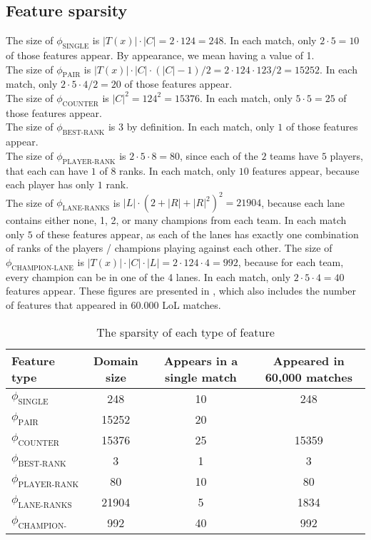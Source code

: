 \subsection{Feature sparsity}\label{sec:featuresparsity}
The size of $\phi_{\text{SINGLE}}$ is $|T(x)| \cdot |C| = 2 \cdot 124 = 248$. In each match, only $2 \cdot 5 = 10$ of those features appear. By appearance, we mean having a value of 1.\\
The size of $\phi_{\text{PAIR}}$ is $|T(x)| \cdot |C| \cdot (|C|-1) / 2 = 2 \cdot 124 \cdot 123 / 2 = 15252$. In each match, only $2 \cdot 5 \cdot 4 / 2 = 20$ of those features appear.\\
The size of $\phi_{\text{COUNTER}}$ is $|C|^2 = 124^2 = 15376$. In each match, only $5 \cdot 5 = 25$ of those features appear.\\
The size of $\phi_{\text{BEST-RANK}}$ is 3 by definition. In each match, only $1$ of those features appear.\\
The size of $\phi_{\text{PLAYER-RANK}}$ is $2 \cdot 5 \cdot 8 = 80$, since each of the $2$ teams have $5$ players, that each can have $1$ of $8$ ranks. In each match, only $10$ features appear, because each player has only $1$ rank.\\
The size of $\phi_{\text{LANE-RANKS}}$ is $|L| \cdot (2 + |R| + |R|^2)^2 = 21904$, because each lane contains either none, 1, 2, or many champions from each team.
In each match only $5$ of these features appear, as each of the lanes has exactly one combination of ranks of the players / champions playing against each other.
The size of $\phi_{\text{CHAMPION-LANE}}$ is $|T(x)| \cdot |C| \cdot |L| = 2 \cdot 124 \cdot 4 = 992$, because for each team, every champion can be in one of the 4 lanes. In each match, only $2 \cdot 5 \cdot 4 = 40$ features appear. 
These figures are presented in , which also includes the number of features that appeared in $60.000$ LoL matches.

\begin{center}
\begin{table}[h]
\begin{tabular}{|l|ccc|}
\hline
Feature type                & Domain size & Appears in a single match & Appeared in 60,000 matches \\ \hline
$\phi_{\text{SINGLE}}$      & 248         & 10 & 248               \\ 
$\phi_{\text{PAIR}}$        & 15252       & 20 &                   \\ 
$\phi_{\text{COUNTER}}$     & 15376       & 25 & 15359             \\ 
$\phi_{\text{BEST-RANK}}$   & 3           & 1  & 3                 \\ 
$\phi_{\text{PLAYER-RANK}}$ & 80          & 10 & 80                \\ 
$\phi_{\text{LANE-RANKS}}$  & 21904       & 5  & 1834              \\ 
$\phi_{\text{CHAMPION-LANE}}$ & 992       & 40 & 992               \\ \hline
\end{tabular}
\caption{The sparsity of each type of feature}\label{tab:featuresparsity}
\end{table}
\end{center}

